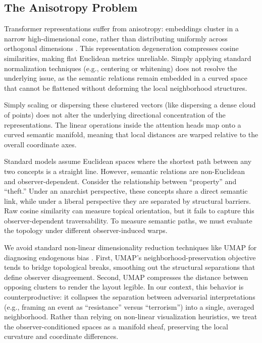 \subsection{The Anisotropy Problem}

Transformer representations suffer from anisotropy: embeddings cluster in a narrow high-dimensional cone, rather than distributing uniformly across orthogonal dimensions \citep{gabaix1999}. This representation degeneration compresses cosine similarities, making flat Euclidean metrics unreliable. Simply applying standard normalization techniques (e.g., centering or whitening) does not resolve the underlying issue, as the semantic relations remain embedded in a curved space that cannot be flattened without deforming the local neighborhood structures.

Simply scaling or dispersing these clustered vectors (like dispersing a dense cloud of points) does not alter the underlying directional concentration of the representations. The linear operations inside the attention heads map onto a curved semantic manifold, meaning that local distances are warped relative to the overall coordinate axes.

Standard models assume Euclidean spaces where the shortest path between any two concepts is a straight line. However, semantic relations are non-Euclidean and observer-dependent. Consider the relationship between ``property'' and ``theft.'' Under an anarchist perspective, these concepts share a direct semantic link, while under a liberal perspective they are separated by structural barriers. Raw cosine similarity can measure topical orientation, but it fails to capture this observer-dependent traversability. To measure semantic paths, we must evaluate the topology under different observer-induced warps.

We avoid standard non-linear dimensionality reduction techniques like UMAP for diagnosing endogenous bias \citep{mcinnes2018}. First, UMAP's neighborhood-preservation objective tends to bridge topological breaks, smoothing out the structural separations that define observer disagreement. Second, UMAP compresses the distance between opposing clusters to render the layout legible. In our context, this behavior is counterproductive: it collapses the separation between adversarial interpretations (e.g., framing an event as ``resistance'' versus ``terrorism'') into a single, averaged neighborhood. Rather than relying on non-linear visualization heuristics, we treat the observer-conditioned spaces as a manifold sheaf, preserving the local curvature and coordinate differences.

